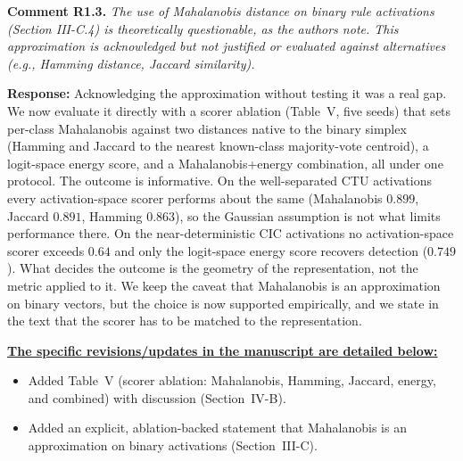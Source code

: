 \documentclass[11pt]{article}
\newcommand{\cmt}[2]{\medskip\noindent\textbf{Comment #1.} \textit{#2}\par}
\newcommand{\resp}{\smallskip\par\noindent\textbf{Response:} }
\newcommand{\revs}{\smallskip\par\noindent\underline{\textbf{The specific revisions/updates in the manuscript are detailed below:}}\par}
\begin{document}
\cmt{R1.3}{The use of Mahalanobis distance on binary rule activations
(Section III-C.4) is theoretically questionable, as the authors note. This
approximation is acknowledged but not justified or evaluated against alternatives
(e.g., Hamming distance, Jaccard similarity).}
\resp Acknowledging the approximation without testing it was a real gap. We now
evaluate it directly with a scorer ablation (Table~V, five seeds) that sets
per-class Mahalanobis against two distances native to the binary simplex (Hamming
and Jaccard to the nearest known-class majority-vote centroid), a logit-space
energy score, and a Mahalanobis+energy combination, all under one protocol. The
outcome is informative. On the well-separated CTU activations every
activation-space scorer performs about the same (Mahalanobis $0.899$, Jaccard
$0.891$, Hamming $0.863$), so the Gaussian assumption is not what limits
performance there. On the near-deterministic CIC activations no activation-space
scorer exceeds $0.64$ and only the logit-space energy score recovers detection
($0.749$). What decides the outcome is the geometry of the representation, not the
metric applied to it. We keep the caveat that Mahalanobis is an approximation on
binary vectors, but the choice is now supported empirically, and we state in the
text that the scorer has to be matched to the representation.
\revs
\begin{itemize}
  \item Added Table~V (scorer ablation: Mahalanobis, Hamming, Jaccard, energy, and
  combined) with discussion (Section~IV-B).
  \item Added an explicit, ablation-backed statement that Mahalanobis is an
  approximation on binary activations (Section~III-C).
\end{itemize}
\end{document}
